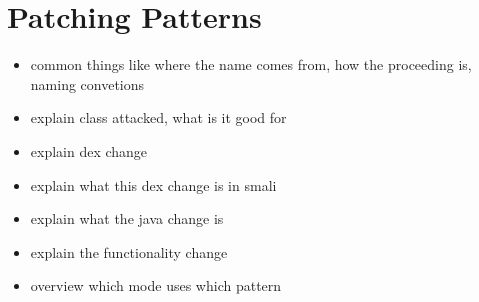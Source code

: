\section{Patching Patterns} \label{section:luckypatcher-patterns}
\begin{itemize}
    \item common things like where the name comes from, how the proceeding is, naming convetions
    \item explain class attacked, what is it good for
    \item explain dex change
    \item explain what this dex change is in smali
    \item explain what the java change is
    \item explain the functionality change
    \item overview which mode uses which pattern
\end{itemize}
